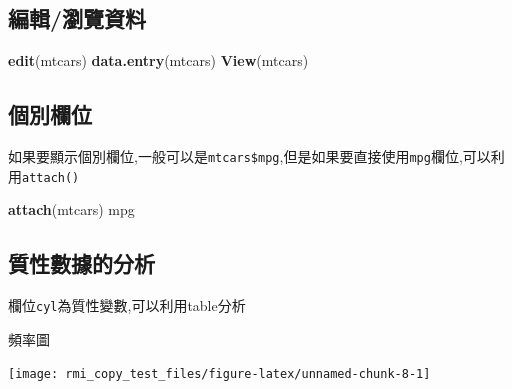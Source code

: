\documentclass[]{book}
\newenvironment{Shaded}{\begin{snugshade}}{\end{snugshade}}
\newcommand{\KeywordTok}[1]{\textcolor[rgb]{0.13,0.29,0.53}{\textbf{#1}}}
\newcommand{\NormalTok}[1]{#1}
\newcommand{\OperatorTok}[1]{\textcolor[rgb]{0.81,0.36,0.00}{\textbf{#1}}}
\theoremstyle{definition}
\theoremstyle{definition}
\theoremstyle{definition}
\theoremstyle{remark}
\begin{document}
\subsection{編輯/瀏覽資料}

\begin{Shaded}
\begin{Highlighting}[]
\KeywordTok{edit}\NormalTok{(mtcars)}
\KeywordTok{data.entry}\NormalTok{(mtcars)}
\KeywordTok{View}\NormalTok{(mtcars)}
\end{Highlighting}
\end{Shaded}

\subsection{個別欄位}

如果要顯示個別欄位,一般可以是\texttt{mtcars\$mpg},但是如果要直接使用\texttt{mpg}欄位,可以利用\texttt{attach()}

\begin{Shaded}
\begin{Highlighting}[]
\KeywordTok{attach}\NormalTok{(mtcars)}
\NormalTok{mpg}
\end{Highlighting}
\end{Shaded}

\subsection{質性數據的分析}

欄位\texttt{cyl}為質性變數,可以利用table分析

\begin{Shaded}
\end{Shaded}

頻率圖

\begin{Shaded}
\end{Shaded}

\begin{center}\texttt{[image: rmi\_copy\_test\_files/figure-latex/unnamed-chunk-8-1]} \end{center}
\end{document}
